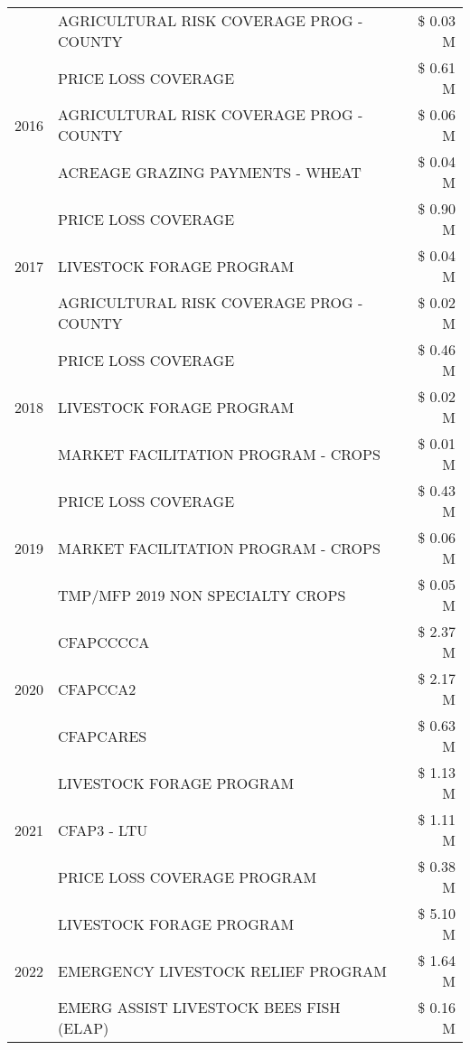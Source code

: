 \begin{tabular}{llr}
 & AGRICULTURAL RISK COVERAGE PROG - COUNTY & \$ 0.03 M \\
\cline{1-3}
\multirow[t]{3}{*}{2016} & PRICE LOSS COVERAGE & \$ 0.61 M \\
 & AGRICULTURAL RISK COVERAGE PROG - COUNTY & \$ 0.06 M \\
 & ACREAGE GRAZING PAYMENTS - WHEAT & \$ 0.04 M \\
\cline{1-3}
\multirow[t]{3}{*}{2017} & PRICE LOSS COVERAGE & \$ 0.90 M \\
 & LIVESTOCK FORAGE PROGRAM & \$ 0.04 M \\
 & AGRICULTURAL RISK COVERAGE PROG - COUNTY & \$ 0.02 M \\
\cline{1-3}
\multirow[t]{3}{*}{2018} & PRICE LOSS COVERAGE & \$ 0.46 M \\
 & LIVESTOCK FORAGE PROGRAM & \$ 0.02 M \\
 & MARKET FACILITATION PROGRAM - CROPS & \$ 0.01 M \\
\cline{1-3}
\multirow[t]{3}{*}{2019} & PRICE LOSS COVERAGE & \$ 0.43 M \\
 & MARKET FACILITATION PROGRAM - CROPS & \$ 0.06 M \\
 & TMP/MFP 2019 NON SPECIALTY CROPS & \$ 0.05 M \\
\cline{1-3}
\multirow[t]{3}{*}{2020} & CFAPCCCCA & \$ 2.37 M \\
 & CFAPCCA2 & \$ 2.17 M \\
 & CFAPCARES & \$ 0.63 M \\
\cline{1-3}
\multirow[t]{3}{*}{2021} & LIVESTOCK FORAGE PROGRAM & \$ 1.13 M \\
 & CFAP3 - LTU & \$ 1.11 M \\
 & PRICE LOSS COVERAGE PROGRAM & \$ 0.38 M \\
\cline{1-3}
\multirow[t]{3}{*}{2022} & LIVESTOCK FORAGE PROGRAM & \$ 5.10 M \\
 & EMERGENCY LIVESTOCK RELIEF PROGRAM & \$ 1.64 M \\
 & EMERG ASSIST LIVESTOCK BEES FISH (ELAP) & \$ 0.16 M \\
\cline{1-3}
\bottomrule
\end{tabular}
